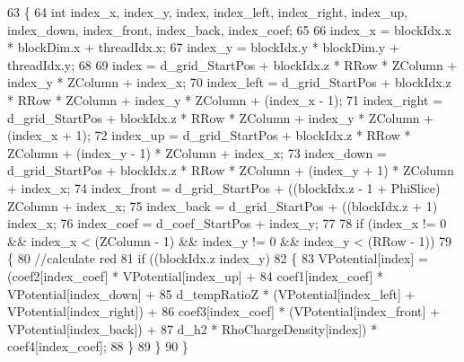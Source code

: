 \begin{DoxyCode}
63 \{
64     \textcolor{keywordtype}{int} index\_x, index\_y, index, index\_left, index\_right, index\_up, index\_down, index\_front, index\_back, 
      index\_coef;
65 
66     index\_x = blockIdx.x * blockDim.x + threadIdx.x;
67     index\_y = blockIdx.y * blockDim.y + threadIdx.y;
68 
69     index       = d\_grid\_StartPos + blockIdx.z * RRow * ZColumn + index\_y * ZColumn + index\_x;
70     index\_left  = d\_grid\_StartPos + blockIdx.z * RRow * ZColumn + index\_y * ZColumn + (index\_x - 1);
71     index\_right = d\_grid\_StartPos + blockIdx.z * RRow * ZColumn + index\_y * ZColumn + (index\_x + 1);
72     index\_up    = d\_grid\_StartPos + blockIdx.z * RRow * ZColumn + (index\_y - 1) * ZColumn + index\_x;
73     index\_down  = d\_grid\_StartPos + blockIdx.z * RRow * ZColumn + (index\_y + 1) * ZColumn + index\_x;
74     index\_front = d\_grid\_StartPos + ((blockIdx.z - 1 + PhiSlice) %
      ZColumn + index\_x;
75     index\_back  = d\_grid\_StartPos + ((blockIdx.z + 1) %
      index\_x;
76     index\_coef  = d\_coef\_StartPos + index\_y;
77 
78     \textcolor{keywordflow}{if} (index\_x != 0 && index\_x < (ZColumn - 1) && index\_y != 0 && index\_y < (RRow - 1))
79     \{
80         \textcolor{comment}{//calculate red         }
81         \textcolor{keywordflow}{if} ((blockIdx.z %
      index\_y) %
82         \{           
83             VPotential[index] = (coef2[index\_coef] * VPotential[index\_up] + 
84                                 coef1[index\_coef] * VPotential[index\_down] + 
85                                 d\_tempRatioZ * (VPotential[index\_left] + VPotential[index\_right]) + 
86                                 coef3[index\_coef] * (VPotential[index\_front] + VPotential[index\_back]) + 
87                                 d\_h2 * RhoChargeDensity[index]) * coef4[index\_coef];
88         \}
89     \}
90 \}
\end{DoxyCode}
\hypertarget{PoissonSolver3DGPU_8cu_a18166fae41f28362a43f5f09f3ddb537}{}\label{PoissonSolver3DGPU_8cu_a18166fae41f28362a43f5f09f3ddb537} 
